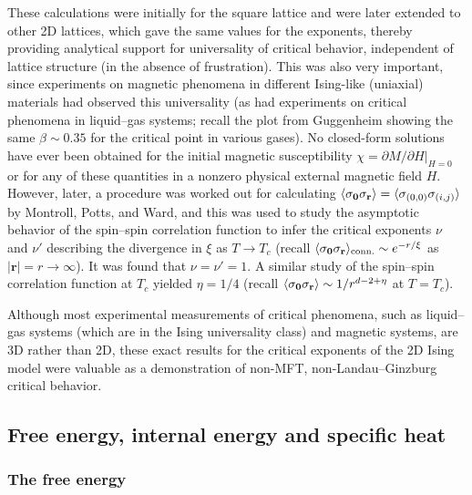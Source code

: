 These calculations were initially for the square lattice and were later extended to other 2D lattices,
which gave the same values for the exponents, thereby providing analytical support for universality of
critical behavior, independent of lattice structure (in the absence of frustration). This was also very
important, since experiments on magnetic phenomena in different Ising-like (uniaxial) materials had
observed this universality (as had experiments on critical phenomena in liquid--gas systems; recall the
plot from Guggenheim showing the same $\beta\sim 0.35$ for the critical point in various gases). No
closed-form solutions have ever been obtained for the initial magnetic susceptibility
$\chi = \left.\partial M/\partial H\right|_{H=0}$ or for any of these quantities in a nonzero physical
external magnetic field $H$. However, later, a procedure was worked out for calculating
$\langle \sigma_{\mathbf 0}\sigma_{\mathbf r}\rangle = \langle \sigma_{(0,0)}\sigma_{(i,j)}\rangle$ by Montroll, Potts, and
Ward, and this was used to study the asymptotic behavior of the spin--spin correlation function to
infer the critical exponents $\nu$ and $\nu'$ describing the divergence in $\xi$ as $T\to T_c$ (recall
$\langle \sigma_{\mathbf 0}\sigma_{\mathbf r}\rangle_{\text{conn.}}\sim e^{-r/\xi}$ as $|\mathbf r| = r\to\infty$).
It was found that $\nu = \nu' = 1$. A similar study of the spin--spin correlation function at $T_c$
yielded $\eta = 1/4$ (recall $\langle \sigma_{\mathbf 0}\sigma_{\mathbf r}\rangle\sim 1/r^{d-2+\eta}$ at
$T = T_c$).

Although most experimental measurements of critical phenomena, such as liquid--gas systems (which are in
the Ising universality class) and magnetic systems, are 3D rather than 2D, these exact results for the
critical exponents of the 2D Ising model were valuable as a demonstration of non-MFT,
non-Landau--Ginzburg critical behavior.

\subsection{Free energy, internal energy and specific heat}
\subsubsection*{The free energy}

